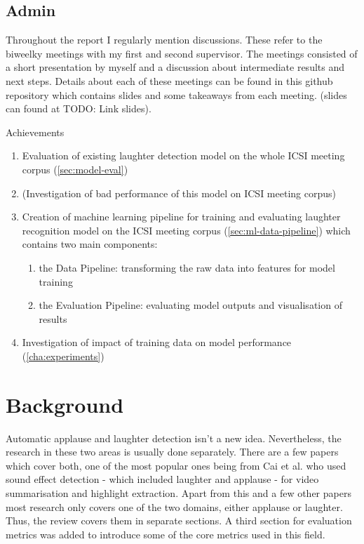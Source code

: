 \documentclass[bsc,frontabs,parskip,deptreport]{infthesis}
\begin{document}
\section{Admin}
Throughout the report I regularly mention discussions. These refer to the biweelky meetings with my first and second supervisor. The meetings consisted of a short presentation by myself and a discussion about intermediate results and next steps. Details about each of these meetings can be found in this github repository which contains slides and some takeaways from each meeting. (slides can found at TODO: Link slides). 

Achievements
\begin{enumerate}
  \item Evaluation of existing laughter detection model on the whole ICSI meeting corpus (\autoref{sec:model-eval})
  \item (Investigation of bad performance of this model on ICSI meeting corpus)
  \item Creation of machine learning pipeline for training and evaluating laughter recognition model on the ICSI meeting corpus (\autoref{sec:ml-data-pipeline}) which contains two main components:
  \begin{enumerate}
      \item the Data Pipeline: transforming the raw data into features for model training
      \item the Evaluation Pipeline: evaluating model outputs and visualisation of results
  \end{enumerate}
  \item Investigation of impact of training data on model performance (\autoref{cha:experiments})
\end{enumerate}

\chapter{Background} \label{cha:bg}
Automatic applause and laughter detection isn't a new idea. Nevertheless, the research in these two areas is usually done separately. There are a few papers which cover both, one of the most popular ones being from Cai et al. \citep{cai2003highlight} who used sound effect detection - which included laughter and applause - for video summarisation and highlight extraction.
Apart from this and a few other papers most research only covers one of the two domains, either applause or laughter. Thus, the review covers them in separate sections. A third section for evaluation metrics was added to introduce some of the core metrics used in this field. 
\end{document}
